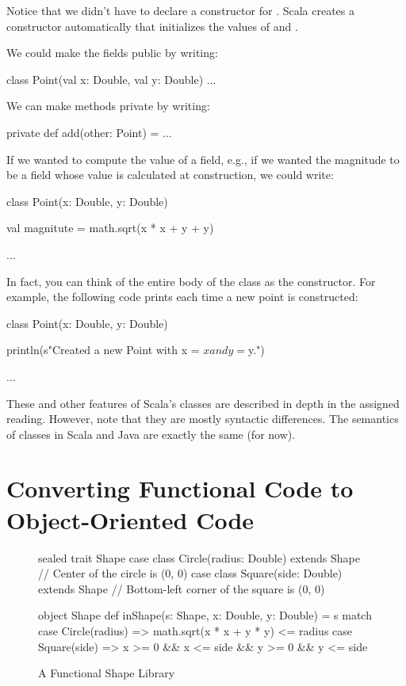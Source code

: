 \documentclass{book}
\begin{document}
Notice that we didn't have to declare a constructor for .
Scala creates a constructor automatically that initializes the values of
 and .

We could make the fields public by writing:
\begin{scalacode}
class Point(val x: Double, val y: Double) { ... }
\end{scalacode}

We can make methods private by writing:
\begin{scalacode}
private def add(other: Point) = { ... }
\end{scalacode}

If we wanted to compute the value of a field, e.g., if we wanted the magnitude
to be a field whose value is calculated at construction, we could write:
%
\begin{scalacode}
class Point(x: Double, y: Double) {

  val magnitute = math.sqrt(x * x + y + y)

  ...
}
\end{scalacode}

In fact, you can think of the entire body of the class as the constructor.
For example, the following code prints each time a new point is constructed:

%
\begin{scalacode}
class Point(x: Double, y: Double) {

  println(s"Created a new Point with x = $x and y = $y.")

  ...
}
\end{scalacode}

These and other features of Scala's classes are described in depth in the
assigned reading. However, note that they are mostly syntactic differences.
The semantics of classes in Scala and Java are exactly the same (for now).

\section{Converting Functional Code to Object-Oriented Code}

\begin{figure}
\begin{scalacode}
sealed trait Shape
case class Circle(radius: Double) extends Shape // Center of the circle is (0, 0)
case class Square(side: Double) extends Shape // Bottom-left corner of the square is (0, 0)

object Shape {
  def inShape(s: Shape, x: Double, y: Double) = s match {
    case Circle(radius) => math.sqrt(x * x + y * y) <= radius
    case Square(side) => x >= 0 && x <= side && y >= 0 && y <= side
  }
}
\end{scalacode}
\caption{A Functional Shape Library}
\label{fshapes1}
\end{figure}
\end{document}
